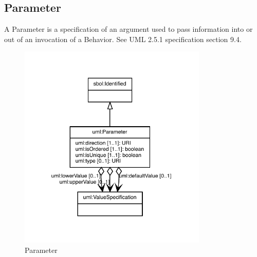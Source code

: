 \subsection{Parameter}%
\label{sec:uml:Parameter}%
A Parameter is a specification of an argument used to pass information into or out of an invocation of a Behavior. See UML 2.5.1 specification section 9.4.%
\linebreak%
\linebreak%


\begin{figure}[h!]%
\centering%
\includegraphics[width=0.8\textwidth]{uml_classes/Parameter_abstraction_hierarchy.pdf}%
\caption{Parameter}%
\label{fig:Parameter}%
\end{figure}

